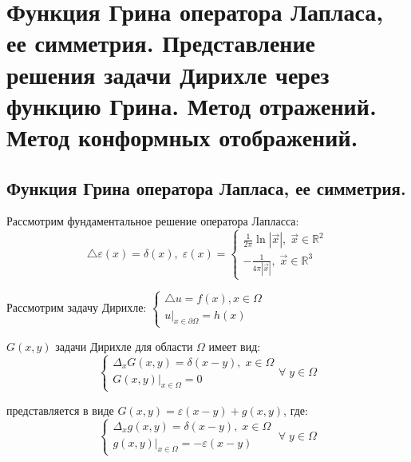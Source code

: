 \chapter{Функция Грина оператора Лапласа, ее симметрия. Представление решения задачи Дирихле через функцию Грина. Метод отражений. Метод конформных отображений.}
\label{cha:17}

\section*{Функция Грина оператора Лапласа, ее симметрия.}

Рассмотрим фундаментальное решение оператора Лапласса:
$$ \triangle \varepsilon (x) = \delta (x) , \; \varepsilon (x) = 
\begin{cases}
	\displaystyle \frac{1}{2 \pi} \ln |\vec{x}|, \; \vec{x} \in \mathbb{R}^2\\
	\displaystyle - \frac{1}{4 \pi |\vec{x}|}, \; \vec{x} \in \mathbb{R}^3
\end{cases}$$

Рассмотрим задачу Дирихле: 
$\begin{cases}
	\triangle u = f (x) , x \in \Omega\\
	u|_{x \in \partial \Omega} = h(x)
\end{cases}$

\begin{definition}
	 $ G(x, y) $ задачи Дирихле для области $ \Omega $ имеет вид:
	$$\begin{cases}
		\Delta_x G(x, y) = \delta(x - y), \; x \in \Omega \\
		G(x, y)|_{x \in \Omega} = 0
	\end{cases} \forall \; y \in \Omega$$
\end{definition}

\begin{definition}
	 представляется в виде $ G(x,y) = \varepsilon(x - y) + g(x, y) $, где:
	$$
	\begin{cases}
		\Delta_x g(x, y) = \delta(x - y), \; x \in \Omega \\
		g(x, y)|_{x \in \Omega} = -\varepsilon(x - y)
	\end{cases} \; \forall \; y \in \Omega
	$$
\end{definition}\newpage

